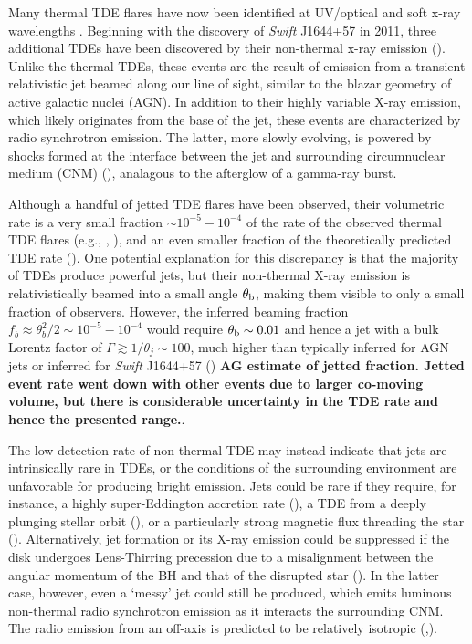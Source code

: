 \documentclass[usenatbib,fleqn]{mnras}
\begin{document}
Many thermal TDE flares have now been identified at UV/optical
\citep{van-Velzen+2011, Gezari+2012, Chornock+2014, Arcavi+2014} and
soft x-ray wavelengths \citep{Esquej+2007}.  Beginning with the
discovery of {\it Swift} J1644+57 in 2011, three additional TDEs have
been discovered by their non-thermal x-ray emission
(\citealt{Bloom+2011, Levan+2011, Burrows+2011, Zauderer+2011,
  Cenko+2012, Pasham+2015, Brown+2015}).  Unlike the thermal TDEs,
these events are the result of emission from a transient relativistic
jet beamed along our line of sight, similar to the blazar geometry of
active galactic nuclei (AGN).  In addition to their highly variable
X-ray emission, which likely originates from the base of the jet,
these events are characterized by radio synchrotron emission.  The
latter, more slowly evolving, is powered by shocks formed at the
interface between the jet and surrounding circumnuclear medium (CNM)
(\citealt{Giannios&Metzger2011,Metzger+2012}), analagous to the
afterglow of a gamma-ray burst.

Although a handful of jetted TDE flares have been observed, their
volumetric rate is a very small fraction $\sim 10^{-5}-10^{-4}$ of the
rate of the observed thermal TDE flares (e.g., \citealt{Burrows+2011},
\citealt{Brown+2015}), and an even smaller fraction of the
theoretically predicted TDE rate (\citealt{Stone&Metzger2016}).  One
potential explanation for this discrepancy is that the majority of
TDEs produce powerful jets, but their non-thermal X-ray emission is
relativistically beamed into a small angle $\theta_{\rm b}$, making
them visible to only a small fraction of observers.  However, the
inferred beaming fraction $f_b \approx \theta_{b}^{2}/2 \sim
10^{-5}-10^{-4}$ would require $\theta_{\rm b} \sim 0.01$ and hence a
jet with a bulk Lorentz factor of $\Gamma \gtrsim 1/\theta_j \sim
100$, much higher than typically inferred for AGN jets or inferred for
{\it Swift} J1644+57 (\citealt{Metzger+2012}) {\bf AG estimate of
  jetted fraction. Jetted event rate went down with other events due
  to larger co-moving volume, but there is considerable uncertainty in
  the TDE rate and hence the presented range.}.

The low detection rate of non-thermal TDE may instead indicate that
jets are intrinsically rare in TDEs, or the conditions of the
surrounding environment are unfavorable for producing bright emission.
Jets could be rare if they require, for instance, a highly
super-Eddington accretion rate (\citealt{De-Colle+2012}), a TDE from a
deeply plunging stellar orbit (\citealt{Metzger&Stone2015}), or a
particularly strong magnetic flux threading the star
(\citealt{Tchekhovskoy+2014,Kelley+2014}).  Alternatively, jet formation
or its X-ray emission could be suppressed if the disk undergoes
Lens-Thirring precession due to a misalignment between the angular
momentum of the BH and that of the disrupted star
(\citealt{Stone&Loeb2012}).  In the latter case, however, even a `messy'
jet could still be produced, which emits luminous non-thermal radio
synchrotron emission as it interacts the surrounding CNM.  The radio
emission from an off-axis is predicted to be relatively isotropic
(\citealt{Giannios&Metzger2011},\citealt{Mimica+2015}).
\end{document}
